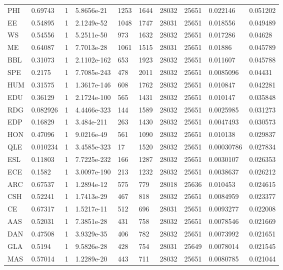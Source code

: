 {\begin{longtable}{llllllllll}
PHI & 0.69743 & 1 & 5.8656e-21 & 1253 & 1644 & 28032 & 25651 & 0.022146 & 0.051202 \\ 
EE & 0.54895 & 1 & 2.1249e-52 & 1048 & 1747 & 28031 & 25651 & 0.018556 & 0.049489 \\ 
WS & 0.54556 & 1 & 5.2511e-50 & 973 & 1632 & 28032 & 25651 & 0.017286 & 0.04628 \\ 
ME & 0.64087 & 1 & 7.7013e-28 & 1061 & 1515 & 28031 & 25651 & 0.01886 & 0.045789 \\ 
BBL & 0.31073 & 1 & 2.1102e-162 & 653 & 1923 & 28032 & 25651 & 0.011607 & 0.045788 \\ 
SPE & 0.2175 & 1 & 7.7085e-243 & 478 & 2011 & 28032 & 25651 & 0.0085096 & 0.04431 \\ 
HUM & 0.31575 & 1 & 1.3617e-146 & 608 & 1762 & 28032 & 25651 & 0.010847 & 0.042281 \\ 
EDU & 0.36129 & 1 & 2.1724e-100 & 565 & 1431 & 28032 & 25651 & 0.010147 & 0.035848 \\ 
RDG & 0.082926 & 1 & 4.4466e-323 & 144 & 1589 & 28032 & 25651 & 0.0025985 & 0.031273 \\ 
EDP & 0.16829 & 1 & 3.484e-211 & 263 & 1430 & 28032 & 25651 & 0.0047493 & 0.030573 \\ 
HON & 0.47096 & 1 & 9.0216e-49 & 561 & 1090 & 28032 & 25651 & 0.010138 & 0.029837 \\ 
QLE & 0.010234 & 1 & 3.4585e-323 & 17 & 1520 & 28032 & 25651 & 0.00030786 & 0.027834 \\ 
ESL & 0.11803 & 1 & 7.7225e-232 & 166 & 1287 & 28032 & 25651 & 0.0030107 & 0.026353 \\ 
ECE & 0.1582 & 1 & 3.0097e-190 & 213 & 1232 & 28032 & 25651 & 0.0038637 & 0.026212 \\ 
ARC & 0.67537 & 1 & 1.2894e-12 & 575 & 779 & 28018 & 25636 & 0.010453 & 0.024615 \\ 
CSH & 0.52241 & 1 & 1.7413e-29 & 467 & 818 & 28032 & 25651 & 0.0084959 & 0.023377 \\ 
CE & 0.67317 & 1 & 1.5217e-11 & 512 & 696 & 28031 & 25651 & 0.0093277 & 0.022008 \\ 
AAS & 0.52031 & 1 & 7.3851e-28 & 431 & 758 & 28032 & 25651 & 0.0078546 & 0.021669 \\ 
DAN & 0.47508 & 1 & 3.9329e-35 & 406 & 782 & 28032 & 25651 & 0.0073992 & 0.021651 \\ 
GLA & 0.5194 & 1 & 9.5826e-28 & 428 & 754 & 28031 & 25649 & 0.0078014 & 0.021545 \\ 
MAS & 0.57014 & 1 & 1.2289e-20 & 443 & 711 & 28032 & 25651 & 0.0080785 & 0.021044 \\ 

\end{longtable}}
